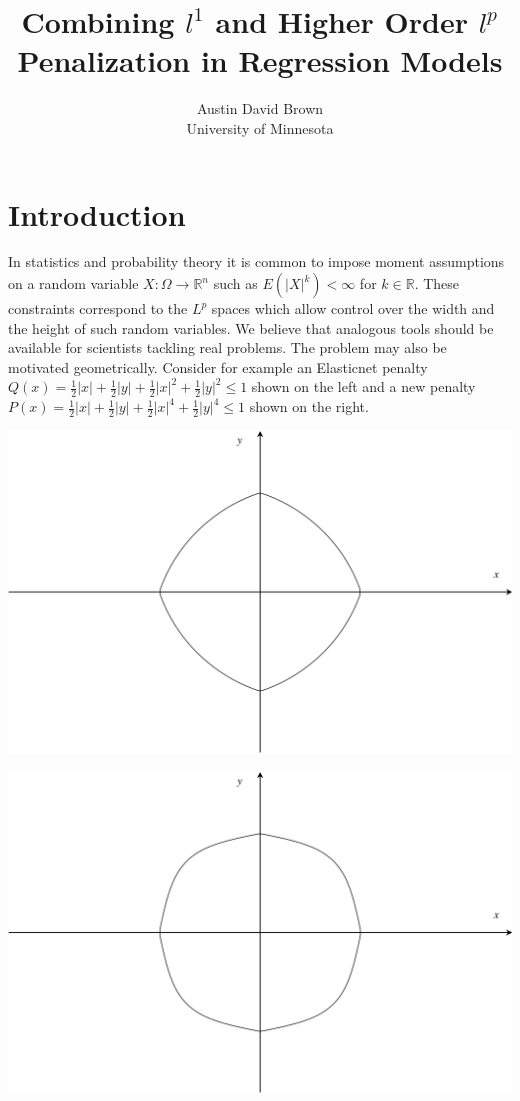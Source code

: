 \documentclass[article]{jss}
\author{Austin David Brown\\University of Minnesota}
\title{Combining $l^1$ and Higher Order $l^p$ Penalization in Regression Models}
\numberwithin{equation}{section}
\newcommand{\R}{\mathbb{R}}
\begin{document}
\section{Introduction}

In statistics and probability theory it is common to impose moment assumptions on a random variable $X : \Omega \to \R^n$ such as $E(|X|^k) < \infty$ for $k \in \R$.
These constraints correspond to the $L^p$ spaces which allow control over the width and the height of such random variables.
We believe that analogous tools should be available for scientists tackling real problems.
The problem may also be motivated geometrically.
Consider for example an Elasticnet penalty $Q(x) = \frac{1}{2} |x| + \frac{1}{2} |y| + \frac{1}{2} |x|^2 + \frac{1}{2} |y|^2 \le 1$
shown on the left and a new penalty $P(x) = \frac{1}{2} |x| + \frac{1}{2} |y| + \frac{1}{2} |x|^4 + \frac{1}{2} |y|^4 \le 1$ shown on the right.


\begin{minipage}{.5\textwidth}
  \centering
  \includegraphics[width=.9\linewidth]{elasticnet.png}
\end{minipage}%
\begin{minipage}{.5\textwidth}
  \centering
  \includegraphics[width=.9\linewidth]{new_penalty_4_moment.png}
\end{minipage}
\end{document}
